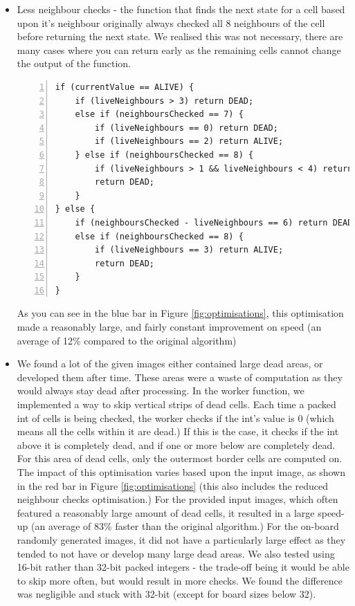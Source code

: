 \documentclass[]{article}
\begin{document}
\begin{itemize}
	\item Less neighbour checks - the function that finds the next state for a cell based upon it's neighbour originally always checked all 8 neighbours of the cell before returning the next state. We realised this was not necessary, there are many cases where you can return early as the remaining cells cannot change the output of the function.
	\begin{lstlisting}[basicstyle=\scriptsize, numbers=left]
if (currentValue == ALIVE) {
	if (liveNeighbours > 3) return DEAD;
	else if (neighboursChecked == 7) {
		if (liveNeighbours == 0) return DEAD;
		if (liveNeighbours == 2) return ALIVE;
	} else if (neighboursChecked == 8) {
		if (liveNeighbours > 1 && liveNeighbours < 4) return ALIVE;
		return DEAD;
	}
} else {
	if (neighboursChecked - liveNeighbours == 6) return DEAD;
	else if (neighboursChecked == 8) {
		if (liveNeighbours == 3) return ALIVE;
		return DEAD;
	}
}
	\end{lstlisting}
	As you can see in the blue bar in Figure \ref{fig:optimisations}, this optimisation made a reasonably large, and fairly constant improvement on speed (an average of 12\% compared to the original algorithm)
	
	\item We found a lot of the given images either contained large dead areas, or developed them after time. These areas were a waste of computation as they would always stay dead after processing. In the worker function, we implemented a way to skip vertical strips of dead cells. Each time a packed int of cells is being checked, the worker checks if the int's value is 0 (which means all the cells within it are dead.) If this is the case, it checks if the int above it is completely dead, and if one or more below are completely dead. For this area of dead cells, only the outermost border cells are computed on. The impact of this optimisation varies based upon the input image, as shown in the red bar in Figure \ref{fig:optimisations} (this also includes the reduced neighbour checks optimisation.) For the provided input images, which often featured a reasonably large amount of dead cells, it resulted in a large speed-up (an average of 83\% faster than the original algorithm.) For the on-board randomly generated images, it did not have a particularly large effect as they tended to not have or develop many large dead areas. We also tested using 16-bit rather than 32-bit packed integers - the trade-off being it would be able to skip more often, but would result in more checks. We found the difference was negligible and stuck with 32-bit (except for board sizes below 32). 
	

\end{itemize}
\end{document}
